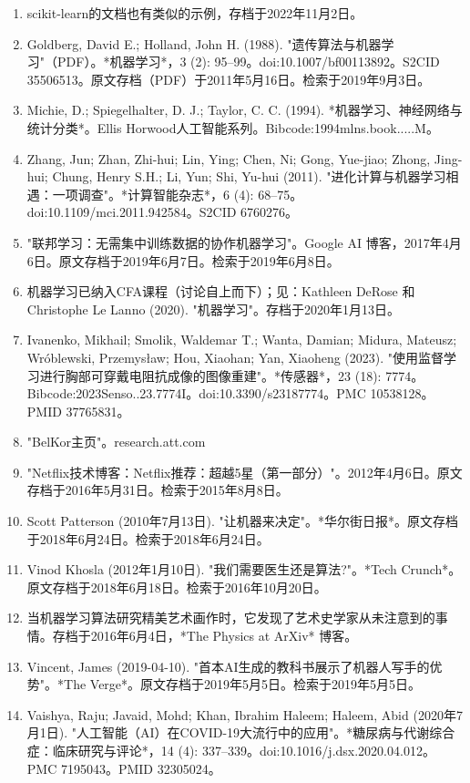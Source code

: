 \begin{enumerate}
\item scikit-learn的文档也有类似的示例，存档于2022年11月2日。
\item Goldberg, David E.; Holland, John H. (1988). "遗传算法与机器学习"（PDF）。*机器学习*，3 (2): 95–99。doi:10.1007/bf00113892。S2CID 35506513。原文存档（PDF）于2011年5月16日。检索于2019年9月3日。
\item Michie, D.; Spiegelhalter, D. J.; Taylor, C. C. (1994). *机器学习、神经网络与统计分类*。Ellis Horwood人工智能系列。Bibcode:1994mlns.book.....M。
\item Zhang, Jun; Zhan, Zhi-hui; Lin, Ying; Chen, Ni; Gong, Yue-jiao; Zhong, Jing-hui; Chung, Henry S.H.; Li, Yun; Shi, Yu-hui (2011). "进化计算与机器学习相遇：一项调查"。*计算智能杂志*，6 (4): 68–75。doi:10.1109/mci.2011.942584。S2CID 6760276。
\item "联邦学习：无需集中训练数据的协作机器学习"。Google AI 博客，2017年4月6日。原文存档于2019年6月7日。检索于2019年6月8日。
\item 机器学习已纳入CFA课程（讨论自上而下）；见：Kathleen DeRose 和 Christophe Le Lanno (2020). "机器学习"。存档于2020年1月13日。
\item Ivanenko, Mikhail; Smolik, Waldemar T.; Wanta, Damian; Midura, Mateusz; Wróblewski, Przemysław; Hou, Xiaohan; Yan, Xiaoheng (2023). "使用监督学习进行胸部可穿戴电阻抗成像的图像重建"。*传感器*，23 (18): 7774。Bibcode:2023Senso..23.7774I。doi:10.3390/s23187774。PMC 10538128。PMID 37765831。
\item "BelKor主页"。research.att.com
\item "Netflix技术博客：Netflix推荐：超越5星（第一部分）"。2012年4月6日。原文存档于2016年5月31日。检索于2015年8月8日。
\item Scott Patterson (2010年7月13日). "让机器来决定"。*华尔街日报*。原文存档于2018年6月24日。检索于2018年6月24日。
\item Vinod Khosla (2012年1月10日). "我们需要医生还是算法?"。*Tech Crunch*。原文存档于2018年6月18日。检索于2016年10月20日。
\item 当机器学习算法研究精美艺术画作时，它发现了艺术史学家从未注意到的事情。存档于2016年6月4日，*The Physics at ArXiv* 博客。
\item Vincent, James (2019-04-10). "首本AI生成的教科书展示了机器人写手的优势"。*The Verge*。原文存档于2019年5月5日。检索于2019年5月5日。
\item Vaishya, Raju; Javaid, Mohd; Khan, Ibrahim Haleem; Haleem, Abid (2020年7月1日). "人工智能（AI）在COVID-19大流行中的应用"。*糖尿病与代谢综合症：临床研究与评论*，14 (4): 337–339。doi:10.1016/j.dsx.2020.04.012。PMC 7195043。PMID 32305024。

\end{enumerate}
